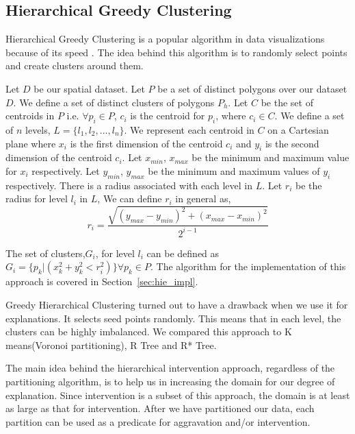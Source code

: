 

\subsection{Hierarchical Greedy Clustering}
Hierarchical Greedy Clustering is a popular algorithm in data visualizations because of its speed \citep{hgclustering}. The idea behind this algorithm is to randomly select points and create clusters around them.

Let $D$ be our spatial dataset. Let $P$ be a set of distinct polygons over our dataset $D$. We define a set of distinct clusters of polygons $P_h$. Let $C$ be the set of centroids in $P$ i.e. $\forall p_i \in P$, $c_i$ is the centroid for $p_i$, where $c_i \in C$. We define a set of $n$ levels, $L = \{l_1, l_2,...,l_n\}$. We represent each centroid in $C$ on a Cartesian plane where $x_i$ is the first dimension of the centroid $c_i$ and $y_i$ is the second dimension of the centroid $c_i$. Let $x_{min}$, $x_{max}$ be the minimum and maximum value for $x_i$ respectively. Let $y_{min}$, $y_{max}$ be the minimum and maximum values of $y_i$ respectively. There is a radius associated with each level in $L$. Let $r_i$ be the radius for level $l_i$ in $L$, We can define $r_i$ in general as,
$$r_i = \frac{\sqrt{(y_{max}-y_{min})^2+(x_{max}-x_{min})^2}}{2^{i-1}}$$

The set of clusters,$G_i$, for level $l_i$ can be defined as $G_i=\{p_k|(x_k^2 + y_k^2 < r_i^2)\}\forall p_k \in P$. The algorithm for the implementation of this approach is covered in Section~\ref{sec:hie_impl}.

Greedy Hierarchical Clustering turned out to have a drawback when we use it for explanations. It selects seed points randomly. This means that in each level, the clusters can be highly imbalanced. We compared this approach to K means(Voronoi partitioning)\citep{hartigan1979algorithm,aurenhammer2000voronoi}, R Tree\citep{guttman1984r} and R* Tree\citep{beckmann1990r}.

The main idea behind the hierarchical intervention approach, regardless of the partitioning algorithm, is to help us in increasing the domain for our degree of explanation. Since intervention is a subset of this approach, the domain is at least as large as that for intervention. After we have partitioned our data, each partition can be used as a predicate for aggravation and/or intervention.

